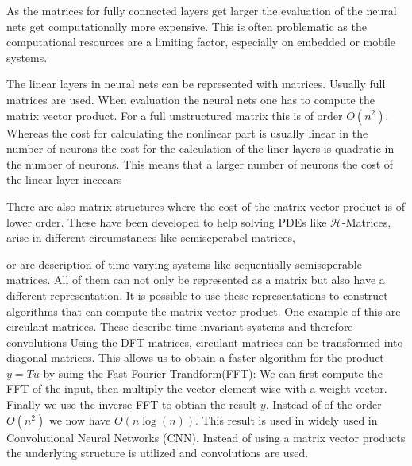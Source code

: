 \documentclass[doctype=mastersthesis,BCOR=15mm,biblatex]{ldvbook}%
\newcommand{\bigO}{O}
\begin{document}

As the matrices for fully connected layers get larger the evaluation of the neural nets get computationally more expensive. This is often problematic as the computational resources are a limiting factor, especially on embedded or mobile systems.


The linear layers in neural nets can be represented with matrices.
Usually full matrices are used.
When evaluation the neural nets one has to compute the matrix vector product.
For a full unstructured matrix this is of order $O(n^2)$. 
Whereas the cost for calculating the nonlinear part is usually linear in the number of neurons the cost for the calculation of the liner layers is quadratic in the number of neurons.
This means that a larger number of neurons the cost of the linear layer inccears 


There are also matrix structures where the cost of the matrix vector product is of lower order.
These have been developed to help solving PDEs like $\mathcal{H}$-Matrices, arise in different circumstances like semiseperabel matrices, %

or are description of time varying systems like sequentially semiseperable matrices.
All of them can not only be represented as a matrix but also have a different representation.
It is possible to use these representations to construct algorithms that can compute the matrix vector product.
One example of this are circulant matrices. 
These describe time invariant systems and therefore convolutions 
Using the DFT matrices, circulant matrices can be transformed into diagonal matrices.
This allows us to obtain a faster algorithm for the product $y=Tu$ by suing the Fast Fourier Trandform(FFT):
We can first compute the FFT of the input, then multiply the vector element-wise with a weight vector. Finally we use the inverse FFT to obtian the result $y$.
Instead of of the order $\bigO(n^2)$ we now have $\bigO(n\log(n))$.
This result is used in widely used in Convolutional Neural Networks (CNN).
Instead of using a matrix vector products the underlying structure is utilized and convolutions are used.
\end{document}
